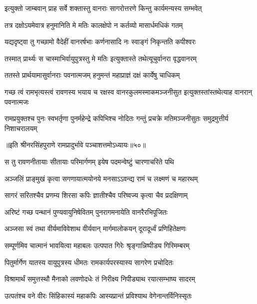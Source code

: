 \twolineshloka
{इत्युक्तो जाम्बवान् प्राह सर्वे शक्तास्तु वानराः}
{सागरोत्तरणे किन्तु कार्यमन्यस्य सम्भवेत्} %

\twolineshloka
{तत्र दक्षोऽयमेवात्र हनुमानिति मे मतिः}
{कालक्षेपो न कर्तव्यो मासार्धमधिकं गतम्} %

\twolineshloka
{यद्यदृष्ट्वा तु गच्छामो वैदेहीं वानरर्षभाः}
{कर्णनासादि नः स्वाङ्गं निकृन्तति कपीश्वरः} %

\twolineshloka
{तस्मात् प्रार्थ्यः स चास्माभिर्वायुपुत्रस्तु मे मतिः}
{इत्युक्तास्ते तथेत्यूचुर्वानरा वृद्धवानरम्} %

\twolineshloka
{ततस्ते प्रार्थयामासुर्वानराः पवनात्मजम्}
{हनुमन्तं महाप्राज्ञं दक्षं कार्येषु चाधिकम्} %

\threelineshloka
{गच्छ त्वं रामभृत्यस्त्वं रावणस्य भयाय च}
{रक्षस्व वानरकुलमस्माकमञ्जनीसुत}
{इत्युक्तस्तांस्तथेत्याह वानरान् पवनात्मजः} %

\fourlineindentedshloka
{रामप्रयुक्तश्च पुनः स्वभर्तृणा}
{पुनर्महेन्द्रे कपिभिश्च नोदितः}
{गन्तुं प्रचक्रे मतिमञ्जनीसुतः}
{समुद्रमुत्तीर्य निशाचरालयम्} %

॥इति श्रीनरसिंहपुराणे रामप्रादुर्भावे पञ्चाशत्तमोऽध्यायः॥५०॥



\twolineshloka
{स तु रावणनीतायाः सीतायाः परिमार्गणम्}
{इयेष पदमन्वेष्टुं चारणाचरिते पथि} %

\twolineshloka
{अञ्जलिं प्राङ्मुखं कृत्वा सगणायात्मयोनये}
{मनसाऽऽवन्द्य रामं च लक्ष्मणं च महारथम्} %

\twolineshloka
{सागरं सरितश्चैव प्रणम्य शिरसा कपिः}
{ज्ञातीश्चैव परिष्वज्य कृत्वा चैव प्रदक्षिणाम्} %

\twolineshloka
{अरिष्टं गच्छ पन्थानं पुण्यवायुनिषेवितम्}
{पुनरागमनायेति वानरैरभिपूजितः} %

\twolineshloka
{अञ्जसा स्वं तथा वीर्यमाविवेशाथ वीर्यवान्}
{मार्गमालोकयन् दूरादूर्ध्वं प्रणिहितेक्षणः} %

\twolineshloka
{सम्पूर्णमिव चात्मानं भावयित्वा महाबलः}
{उत्पपात गिरेः श्रृङ्गान्निष्पीड्य गिरिमम्बरम्} %

\twolineshloka
{पितुर्मार्गेण यातस्य वायुपुत्रस्य धीमतः}
{रामकार्यपरस्यास्य सागरेण प्रचोदितः} %

\twolineshloka
{विश्रामार्थं समुत्तस्थौ मैनाको लवणोदधेः}
{तं निरीक्ष्य निपीड्याथ रयात्सम्भाष्य सादरम्} %

\twolineshloka
{उत्पतंश्च वने वीरः सिंहिकास्यं महाकपिः}
{आस्यप्रान्तं प्रविश्याथ वेगेनान्तर्विनिस्सृतः} %

